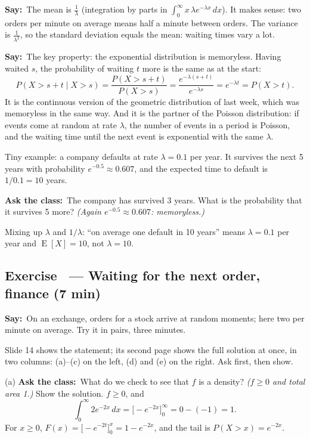 \documentclass[11pt,a4paper,parskip=half]{scrartcl}
\renewcommand{\needspace}[1]{\Needspace{6\baselineskip}}
\newcommand{\E}{\operatorname{E}}
\newcommand{\say}{\textbf{\color{teal}Say:}\ }
\newcommand{\ask}{\textbf{\color{navy}Ask the class:}\ }
\begin{document}
\say The mean is $\frac1\lambda$ (integration by parts in
$\int_0^\infty x\,\lambda e^{-\lambda x}\,dx$). It makes sense: two orders
per minute on average means half a minute between orders. The variance is
$\frac1{\lambda^2}$, so the standard deviation equals the mean: waiting
times vary a lot.

\say The key property: the exponential distribution is memoryless. Having
waited $s$, the probability of waiting $t$ more is the same as at the
start:
\[ P(X>s+t\mid X>s)=\frac{P(X>s+t)}{P(X>s)}
	=\frac{e^{-\lambda(s+t)}}{e^{-\lambda s}}=e^{-\lambda t}=P(X>t). \]
It is the continuous version of the geometric distribution of last week,
which was memoryless in the same way. And it is the partner of the
Poisson distribution: if events come at random at rate $\lambda$, the
number of events in a period is Poisson, and the waiting time until the
next event is exponential with the same $\lambda$.

Tiny example: a company defaults at rate $\lambda=0.1$ per year. It
survives the next 5 years with probability $e^{-0.5}\approx0.607$, and
the expected time to default is $1/0.1=10$ years.

\ask The company has survived 3 years. What is the probability that it
survives 5 more? \emph{(Again $e^{-0.5}\approx0.607$: memoryless.)}

\begin{mistake}
	Mixing up $\lambda$ and $1/\lambda$: ``on average one default in 10
	years'' means $\lambda=0.1$ per year and $\E[X]=10$, not $\lambda=10$.
\end{mistake}

\needspace{0.25\textheight}
\subsection{Exercise~ --- Waiting for the next order, finance (7 min)}


\say On an exchange, orders for a stock arrive at random moments; here two
per minute on average. Try it in pairs, three minutes.

\begin{slidecue}
	Slide 14 shows the statement; its second page shows the full solution at
	once, in two columns: (a)--(c) on the left, (d) and (e) on the right.
	Ask first, then show.
\end{slidecue}

(a) \ask What do we check to see that $f$ is a density? \emph{($f\ge0$
and total area 1.)} Show the solution. $f\ge0$, and
\[ \int_0^\infty2e^{-2x}\,dx=\Big[-e^{-2x}\Big]_0^\infty=0-(-1)=1. \]
For $x\ge0$, $F(x)=\big[-e^{-2t}\big]_0^x=1-e^{-2x}$, and the tail is
$P(X>x)=e^{-2x}$.
\end{document}
